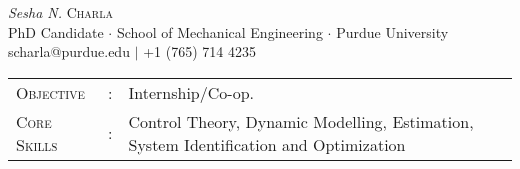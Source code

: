 \documentclass[letterpaper,10pt]{article}
\begin{document}
\begin{center}
\thispagestyle{empty}
\huge{\textit{Sesha N.} \textsc{Charla}}\\
\small PhD Candidate $\cdot$ School of Mechanical Engineering $\cdot$ Purdue University\\
\small scharla@purdue.edu $\mid$ +1 (765) 714 4235   \\
\end{center}


\begin{tabular}{l c l}
    {\large{\textsc{Objective}}}&:& Internship$/$Co-op.\\
{\large{\textsc{Core Skills}}}&:& Control Theory, Dynamic Modelling, Estimation,
System Identification and Optimization\\
\end{tabular}

\end{document}
